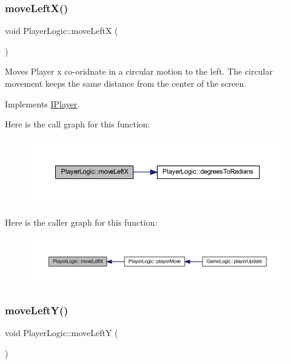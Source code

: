 \subsubsection{\texorpdfstring{move\+Left\+X()}{moveLeftX()}}
{\footnotesize\ttfamily void Player\+Logic\+::move\+LeftX (\begin{DoxyParamCaption}{ }\end{DoxyParamCaption})\hspace{0.3cm}{\ttfamily [virtual]}}



Moves Player x co-\/oridnate in a circular motion to the left. The circular movement keeps the same distance from the center of the screen. 



Implements \hyperlink{class_i_player_a46d098eef1da625e555852341ced76c9}{I\+Player}.

Here is the call graph for this function\+:
\nopagebreak
\begin{figure}[H]
\begin{center}
\leavevmode
\includegraphics[width=350pt]{class_player_logic_ac4d252e80757e05b5799ab689ee27d5e_cgraph}
\end{center}
\end{figure}
Here is the caller graph for this function\+:
\nopagebreak
\begin{figure}[H]
\begin{center}
\leavevmode
\includegraphics[width=350pt]{class_player_logic_ac4d252e80757e05b5799ab689ee27d5e_icgraph}
\end{center}
\end{figure}
\mbox{\label{class_player_logic_a006a7633ae5839d307bb90099f9d2745}} 
\subsubsection{\texorpdfstring{move\+Left\+Y()}{moveLeftY()}}
{\footnotesize\ttfamily void Player\+Logic\+::move\+LeftY (\begin{DoxyParamCaption}{ }\end{DoxyParamCaption})\hspace{0.3cm}{\ttfamily [virtual]}}



